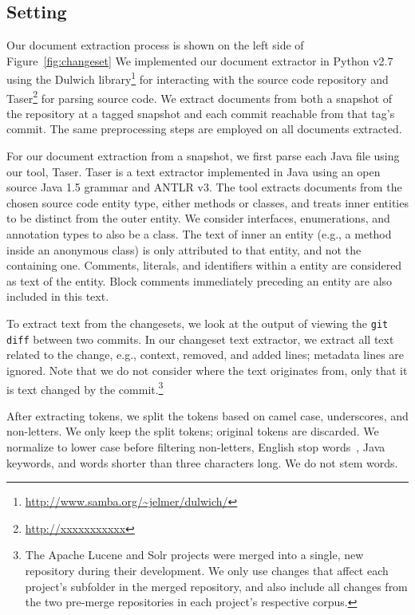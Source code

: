 
\subsection{Setting}

Our document extraction process is shown on the left side of Figure~\ref{fig:changeset}
We implemented our document extractor in Python v2.7
using the Dulwich library\footnote{\url{http://www.samba.org/~jelmer/dulwich/}}
for interacting with the source code repository and
Taser\footnote{\url{http://xxxxxxxxxxx}} for parsing source code.
We extract documents from both a snapshot of the repository at a tagged
snapshot and each commit reachable from that tag's commit.
The same preprocessing steps are employed on all documents extracted.

For our document extraction from a snapshot, we first parse each Java file using our tool, Taser.
Taser is a text extractor implemented in Java using an open source Java 1.5 grammar and ANTLR v3.
The tool extracts documents from the chosen source code entity type,
either methods or classes, and treats inner entities to be distinct from the outer entity.
We consider interfaces, enumerations, and annotation types to also be a class.
The text of inner an entity (e.g., a method inside an anonymous class)
is only attributed to that entity, and not the containing one.
Comments, literals, and identifiers within a entity are considered as text of the entity.
Block comments immediately preceding an entity are also included in this text.

To extract text from the changesets, we look at the output of viewing
the \texttt{git diff} between two commits.
In our changeset text extractor, we extract all text related to the
change, e.g., context, removed, and added lines; metadata lines are ignored.
Note that we do not consider where the text originates from,
only that it is text changed by the commit.\footnote{
The Apache Lucene and Solr projects were merged into a single, new repository
during their development.
We only use changes that affect each project's subfolder in the merged repository,
and also include all changes from the two pre-merge repositories in each project's respective corpus.
}

After extracting tokens, we split the tokens based on camel case,
underscores, and non-letters.
We only keep the split tokens; original tokens are discarded.
We normalize to lower case before filtering non-letters, English stop words~\cite{StopWords}, Java keywords, and words shorter than three characters long.
We do not stem words. 

